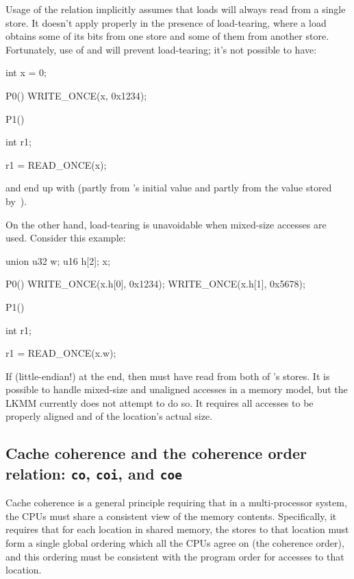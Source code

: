 Usage of the  relation implicitly assumes that loads will always
read from a single store.
It doesn't apply properly in the presence of load-tearing, where a
load obtains some of its bits from one store and some of them from
another store.
Fortunately, use of  and  will
prevent load-tearing; it's not possible to have:

\begin{VerbatimU}
	int x = 0;

	P0()
	{
		WRITE_ONCE(x, 0x1234);
	}

	P1()
	{
		int r1;

		r1 = READ_ONCE(x);
	}
\end{VerbatimU}

\noindent%
and end up with  (partly from 's initial value
and partly from the value stored by~).

On the other hand, load-tearing is unavoidable when mixed-size
accesses are used.
Consider this example:

\begin{VerbatimU}
	union {
		u32	w;
		u16	h[2];
	} x;

	P0()
	{
		WRITE_ONCE(x.h[0], 0x1234);
		WRITE_ONCE(x.h[1], 0x5678);
	}

	P1()
	{
		int r1;

		r1 = READ_ONCE(x.w);
	}
\end{VerbatimU}

If  (little-endian{!}) at the end, then 
must have read from both of 's stores.
It is possible to handle mixed-size and unaligned accesses in a memory
model, but the LKMM currently does not attempt to do so.
It requires all accesses to be properly aligned and of the location's
actual size.


\subsection{Cache coherence and the coherence order relation: \texttt{co}, \texttt{coi}, and \texttt{coe}}
\label{sec:docs:explanation:Cache coherence and the coherence order relation}

Cache coherence is a general principle requiring that in a
multi-processor system, the CPUs must share a consistent view of the
memory contents.
Specifically, it requires that for each location in shared memory,
the stores to that location must form a single global ordering which
all the CPUs agree on (the coherence order), and this ordering must be
consistent with the program order for accesses to that location.

